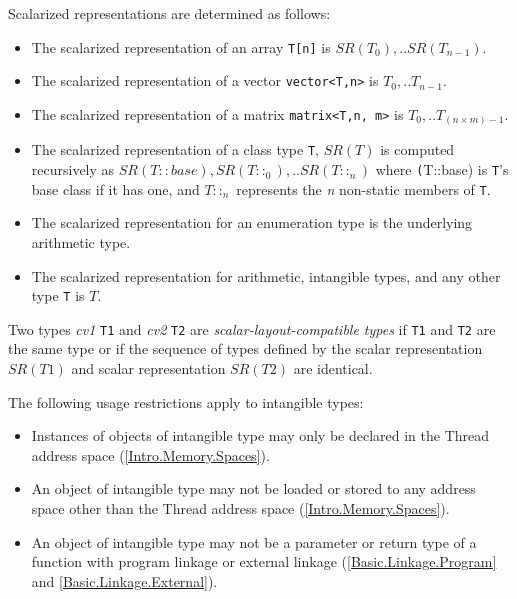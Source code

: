 \p Scalarized representations are determined as follows:
\begin{itemize}
\item The scalarized representation of an array \texttt{T[n]} is \(SR(T_0), ..
SR(T_{n-1})\).

\item The scalarized representation of a vector \texttt{vector<T,n>} is \(T_0,
.. T_{n-1}\).

\item The scalarized representation of a matrix \texttt{matrix<T,n, m>} is
\(T_0, .. T_{(n \times m)-1}\).

\item The scalarized representation of a class type \texttt{T}, \(SR(T)\) is
computed recursively as \(SR(T::base), SR(T::_0), .. SR(T::_n)\) where
\texttt(T::base) is \texttt{T}'s base class if it has one, and \(T::_n\)
represents the \textit{n} non-static members of \texttt{T}.

\item The scalarized representation for an enumeration type is the underlying
arithmetic type.

\item The scalarized representation for arithmetic, intangible types, and any other
type \texttt{T} is \(T\).
\end{itemize}

\p Two types \textit{cv1} \texttt{T1} and \textit{cv2} \texttt{T2} are
\textit{scalar-layout-compatible types} if \texttt{T1} and \texttt{T2} are the same
type or if the sequence of types defined by the scalar representation \(SR(T1)\)
and scalar representation \(SR(T2)\) are identical.


\p The following usage restrictions apply to intangible types:
\begin{itemize}

\item Instances of objects of intangible type may only be declared in the Thread
address space (\ref{Intro.Memory.Spaces}).

\item An object of intangible type may not be loaded or stored to any address
space other than the Thread address space
(\ref{Intro.Memory.Spaces}).

\item An object of intangible type may not be a parameter or return type of a
function with program linkage or external linkage (\ref{Basic.Linkage.Program}
and \ref{Basic.Linkage.External}).
\end{itemize}

